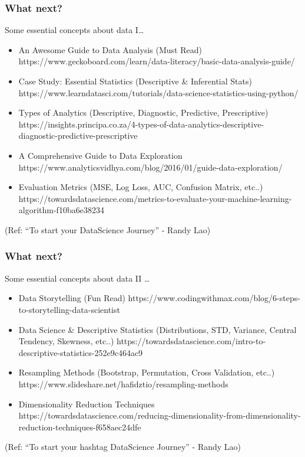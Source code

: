 \begin{frame}\frametitle{What next?}
Some essential concepts about data I\ldots

\footnotesize
\begin{itemize}
\item An Awesome Guide to Data Analysis (Must Read)
https://www.geckoboard.com/learn/data-literacy/basic-data-analysis-guide/

\item  Case Study: Essential Statistics (Descriptive \& Inferential Stats)
https://www.learndatasci.com/tutorials/data-science-statistics-using-python/

\item Types of Analytics (Descriptive, Diagnostic, Predictive, Prescriptive)
https://insights.principa.co.za/4-types-of-data-analytics-descriptive-diagnostic-predictive-prescriptive

\item  A Comprehensive Guide to Data Exploration 
https://www.analyticsvidhya.com/blog/2016/01/guide-data-exploration/

\item  Evaluation Metrics (MSE, Log Loss, AUC, Confusion Matrix, etc..)
https://towardsdatascience.com/metrics-to-evaluate-your-machine-learning-algorithm-f10ba6e38234
\end{itemize}

(Ref: ``To start your DataScience Journey'' - Randy Lao)
\end{frame}


\begin{frame}\frametitle{What next?}
Some essential concepts about data II \ldots

\footnotesize
\begin{itemize}

\item  Data Storytelling (Fun Read)
https://www.codingwithmax.com/blog/6-steps-to-storytelling-data-scientist

\item Data Science \& Descriptive Statistics (Distributions, STD, Variance, Central Tendency, Skewness, etc..)
https://towardsdatascience.com/intro-to-descriptive-statistics-252e9c464ac9

\item  Resampling Methods (Bootstrap, Permutation, Cross Validation, etc..)
https://www.slideshare.net/hafidztio/resampling-methods

\item  Dimensionality Reduction Techniques 
https://towardsdatascience.com/reducing-dimensionality-from-dimensionality-reduction-techniques-f658aec24dfe
\end{itemize}

(Ref: ``To start your hashtag DataScience Journey'' - Randy Lao)
\end{frame}


